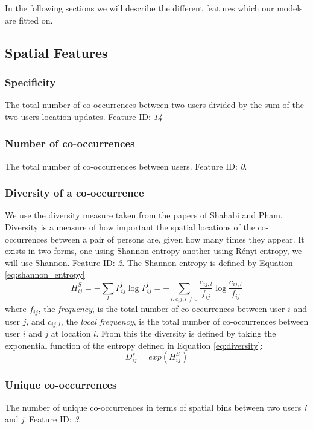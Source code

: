 In the following sections we will describe the different features which our models are fitted on.

\subsection{Spatial Features}

\subsubsection{Specificity}
The total number of co-occurrences between two users divided by the sum of the two users location updates. Feature ID: \textit{14}

\subsubsection{Number of co-occurrences}
The total number of co-occurrences between users. Feature ID: \textit{0}.

\subsubsection{Diversity of a co-occurrence}
We use the diversity measure taken from the papers of Shahabi and Pham\cite{iRWRfSD}\cite{AEBMtISSfSD}.
Diversity is a measure of how important the spatial locations of the co-occurrences between a pair of persons are, given how many times they appear.
It exists in two forms, one using Shannon entropy another using Rényi entropy, we will use Shannon. Feature ID: \textit{2}.
The Shannon entropy is defined by Equation \ref{eq:shannon_entropy}
\begin{equation}
\label{eq:shannon_entropy}
H^S_{ij}=-\sum\limits_{l}P^l_{ij} \log P^l_{ij}= -\sum\limits_{l,c_ij,l\neq 0}\frac{c_{ij,l}}{f_{ij}}\log \frac{c_{ij,l}}{f_{ij}}
\end{equation}
where $f_{ij}$, the \textit{frequency}, is the total number of co-occurrences between user $i$ and user $j$, and $c_{ij,l}$, the \textit{local frequency}, is the total number of co-occurrences between user $i$ and $j$ at location $l$.
From this the diversity is defined by taking the exponential function of the entropy defined in Equation \ref{eq:diversity}:
\begin{equation}
\label{eq:diversity}
D^s_{ij} = exp(H^S_{ij})
\end{equation}

\subsubsection{Unique co-occurrences}
The number of unique co-occurrences in terms of spatial bins between two users \textit{i} and \textit{j}. Feature ID: \textit{3}.

